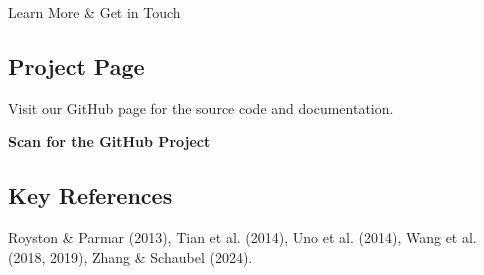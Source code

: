 \documentclass[a0,landscape]{a0poster}
\begin{document}
\begin{multicols}{3}
\begin{posterbox}{Learn More \& Get in Touch}
    \subsection*{\Huge Project Page}
    \huge
    Visit our GitHub page for the source code and documentation.
    \begin{center}
        
        \textbf{\huge Scan for the GitHub Project}
    \end{center}

    \subsection*{\huge Key References}
    \Large
    Royston \& Parmar (2013), Tian et al. (2014), Uno et al. (2014), Wang et al. (2018, 2019), Zhang \& Schaubel (2024).
\end{posterbox}

\end{multicols}
\end{document}
